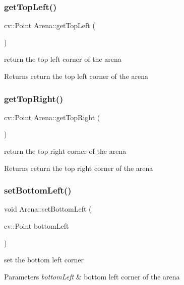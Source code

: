 \subsubsection{\texorpdfstring{get\+Top\+Left()}{getTopLeft()}}
{\footnotesize\ttfamily cv\+::\+Point Arena\+::get\+Top\+Left (\begin{DoxyParamCaption}{ }\end{DoxyParamCaption})}

return the top left corner of the arena \begin{DoxyReturn}{Returns}
return the top left corner of the arena 
\end{DoxyReturn}
\mbox{\label{class_arena_aa417bc8757d66038038ac3f6a9d44860}} 
\subsubsection{\texorpdfstring{get\+Top\+Right()}{getTopRight()}}
{\footnotesize\ttfamily cv\+::\+Point Arena\+::get\+Top\+Right (\begin{DoxyParamCaption}{ }\end{DoxyParamCaption})}

return the top right corner of the arena \begin{DoxyReturn}{Returns}
return the top right corner of the arena 
\end{DoxyReturn}
\mbox{\label{class_arena_ac546db1983967fcc195369c8a0f1f9e5}} 
\subsubsection{\texorpdfstring{set\+Bottom\+Left()}{setBottomLeft()}}
{\footnotesize\ttfamily void Arena\+::set\+Bottom\+Left (\begin{DoxyParamCaption}\item[{cv\+::\+Point}]{bottom\+Left }\end{DoxyParamCaption})}

set the bottom left corner 
\begin{DoxyParams}{Parameters}
{\em bottom\+Left} & bottom left corner of the arena \\
\hline
\end{DoxyParams}
\mbox{\label{class_arena_a2207ae5feab0d9ef8a19ab46fdd8685c}} 
